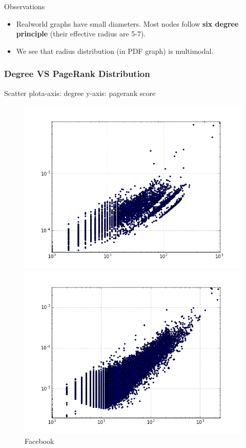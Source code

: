 Observations
\begin{itemize}
\item Realworld graphs have small diameters. Most nodes follow \textbf{six degree principle} (their effective radius are 5-7). 
\item We see that radius distribution (in PDF graph) is multimodal.
\end{itemize}

\subsubsection{Degree VS PageRank Distribution}

Scatter plot\quad a-axis: degree \quad y-axis: pagerank score

\begin{figure}[H]
  \includegraphics[width=\linewidth]{img/facebook/degreeVSpagerank.png}
  \caption*{Facebook}
\endminipage\hfill
{}
  \includegraphics[width=\linewidth]{img/slashDot/degreeVSpagerank.png}

\end{figure}

